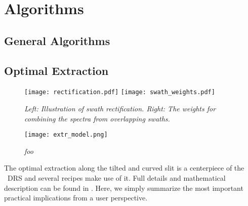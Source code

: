 \section{Algorithms}
\label{sec:algorithms}


\subsection{General Algorithms}
\label{sec:algorithms-general}

\subsection{Optimal Extraction}
\label{sec:extract}
\begin{figure}[ht]
    \begin{center}
\texttt{[image: rectification.pdf]}
\texttt{[image: swath\_weights.pdf]}
\end{center}
\caption{\it Left: Illustration of swath rectification. Right: The weights for combining the spectra from overlapping swaths.}
\label{fig:swaths}
\end{figure}

\begin{figure}[ht]
    \begin{center}
\texttt{[image: extr\_model.png]}
\end{center}
\caption{\it foo}
\label{fig:extrmodel}
\end{figure}

The optimal extraction along the tilted and curved slit is a centerpiece of the
\instrument\ DRS and several recipes make use of it. Full details and
mathematical description can be found in \cite{2021A&A...646A..32P}. Here, we
simply summarize the most important practical implications from a user
perspective.

